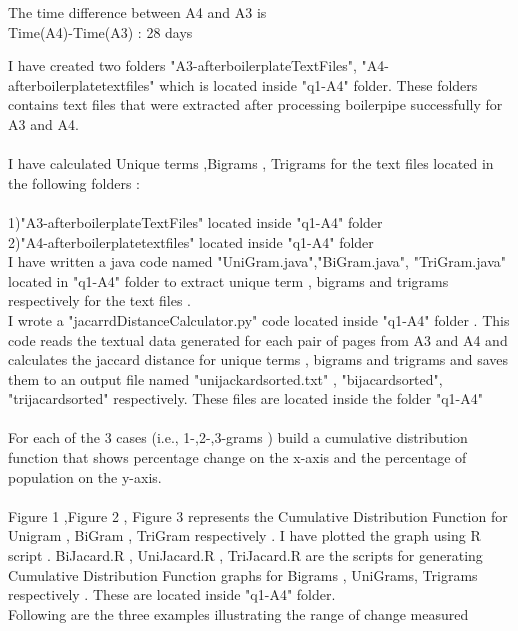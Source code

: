 \documentclass[12pt]{Report}
\begin{document}
The time difference between A4 and A3 is \\

Time(A4)-Time(A3) : 28 days

I have created two folders "A3-afterboilerplateTextFiles", "A4-afterboilerplatetextfiles" which is located inside "q1-A4" folder. These folders contains text files that were extracted after processing boilerpipe successfully for A3 and A4.\\\\

I have calculated Unique terms ,Bigrams , Trigrams for the text files located in the following folders :\\ \\
1)"A3-afterboilerplateTextFiles"  located inside "q1-A4" folder  \\
2)"A4-afterboilerplatetextfiles" located inside "q1-A4" folder \\

I have written a java code named "UniGram.java","BiGram.java", "TriGram.java"  located in "q1-A4" folder to extract unique term , bigrams and trigrams respectively for the text files . \\

I wrote a "jacarrdDistanceCalculator.py" code located inside "q1-A4" folder . This code reads the textual data generated for each pair of pages from A3 and A4 and calculates the jaccard distance for unique terms , bigrams and trigrams and saves them to an output file named "unijackardsorted.txt" , "bijacardsorted", "trijacardsorted" respectively. These files are located inside the folder "q1-A4" \\ \\

For each of the 3 cases (i.e., 1-,2-,3-grams ) build a cumulative distribution function that shows percentage change on the x-axis and the percentage of population on the y-axis. \\ \\

Figure 1 ,Figure 2 , Figure 3 represents the Cumulative Distribution Function for Unigram , BiGram , TriGram respectively .  I have plotted the graph using R script . BiJacard.R , UniJacard.R , TriJacard.R are the scripts for generating Cumulative Distribution Function  graphs for Bigrams , UniGrams, Trigrams respectively . These are located inside "q1-A4" folder.\\

Following are the three examples illustrating the range of change measured \\
\end{document}

